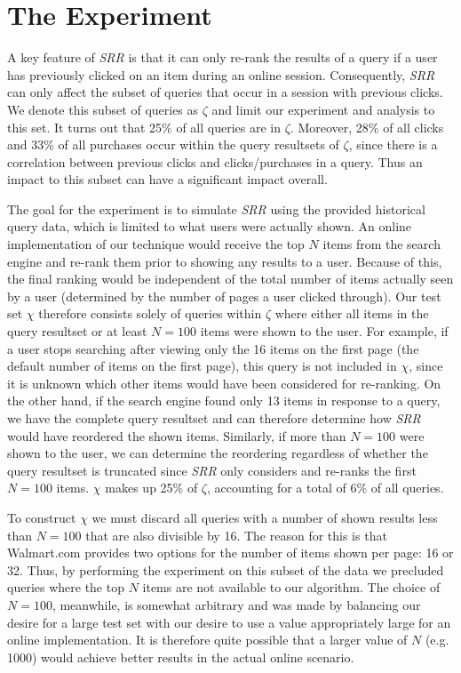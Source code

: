 \documentclass{article}
\begin{document}
\section{The Experiment}
A key feature of {\em SRR} is that it can only re-rank the results of a query if
a user has previously clicked on an item during an online session.
Consequently, {\em SRR} can only affect the subset of queries that occur in a
session with previous clicks. We denote this subset of queries as $\zeta$ and
limit our experiment and analysis to this set. It turns out that 25\% of all
queries are in $\zeta$. Moreover, 28\% of all clicks and 33\% of all purchases
occur within the query resultsets of $\zeta$, since there is a correlation
between previous clicks and clicks/purchases in a query.  Thus an impact to this
subset can have a significant impact overall.

The goal for the experiment is to simulate {\em SRR} using the provided
historical query data, which is limited to what users were actually shown. An
online implementation of our technique would receive the top $N$ items from the
search engine and re-rank them prior to showing any results to a user. Because
of this, the final ranking would be independent of the total number of items
actually seen by a user (determined by the number of pages a user clicked
through).  Our test set $\chi$ therefore consists solely of queries within
$\zeta$ where either all items in the query resultset or at least $N=100$ items
were shown to the user. For example, if a user stops searching after viewing
only the 16 items on the first page (the default number of items on the first
page), this query is not included in $\chi$, since it is unknown which other
items would have been considered for re-ranking. On the other hand, if the
search engine found only 13 items in response to a query,  we have the complete
query resultset and can therefore determine how {\em SRR} would have reordered
the shown items. Similarly, if more than $N=100$ were shown to the user, we can
determine the reordering regardless of whether the query resultset is truncated
since {\em SRR} only considers and re-ranks the first $N=100$ items. $\chi$
makes up 25\% of $\zeta$, accounting for a total of 6\% of all queries.

To construct $\chi$ we  must discard all queries with a number of shown results
less than $N=100$ that are also divisible by 16. The reason for this is that
Walmart.com provides two options for the number of items shown per page: 16 or
32. Thus, by performing the experiment on this subset of the data we precluded
queries where the top $N$ items are not available to our algorithm.  The choice
of $N=100$, meanwhile, is somewhat arbitrary and was made by balancing our
desire for a large test set with our desire to use a value appropriately large
for an online implementation. It is therefore quite possible that a larger value
of $N$ (e.g. 1000) would achieve better results in the actual online scenario.
\end{document}
